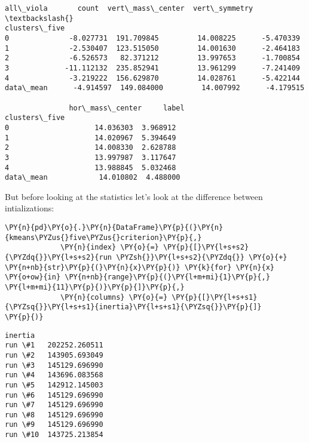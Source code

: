             \begin{tcolorbox}[breakable, size=fbox, boxrule=.5pt, pad at break*=1mm, opacityfill=0]
\begin{Verbatim}[commandchars=\\\{\}]
               all\_viola       count  vert\_mass\_center  vert\_symmetry  \textbackslash{}
clusters\_five
0              -8.027731  191.709845         14.008225      -5.470339
1              -2.530407  123.515050         14.001630      -2.464183
2              -6.526573   82.371212         13.997653      -1.700854
3             -11.112132  235.852941         13.961299      -7.241409
4              -3.219222  156.629870         14.028761      -5.422144
data\_mean      -4.914597  149.084000         14.007992      -4.179515

               hor\_mass\_center     label
clusters\_five
0                    14.036303  3.968912
1                    14.020967  5.394649
2                    14.008330  2.628788
3                    13.997987  3.117647
4                    13.988845  5.032468
data\_mean            14.010802  4.488000
\end{Verbatim}
\end{tcolorbox}
        
    But before looking at the statistics let's look at the difference
between intializations:

    \begin{tcolorbox}[breakable, size=fbox, boxrule=1pt, pad at break*=1mm,colback=cellbackground, colframe=cellborder]
\begin{Verbatim}[commandchars=\\\{\}]
\PY{n}{pd}\PY{o}{.}\PY{n}{DataFrame}\PY{p}{(}\PY{n}{kmeans\PYZus{}five\PYZus{}criterion}\PY{p}{,} 
             \PY{n}{index} \PY{o}{=} \PY{p}{[}\PY{l+s+s2}{\PYZdq{}}\PY{l+s+s2}{run \PYZsh{}}\PY{l+s+s2}{\PYZdq{}} \PY{o}{+} \PY{n+nb}{str}\PY{p}{(}\PY{n}{x}\PY{p}{)} \PY{k}{for} \PY{n}{x} \PY{o+ow}{in} \PY{n+nb}{range}\PY{p}{(}\PY{l+m+mi}{1}\PY{p}{,} \PY{l+m+mi}{11}\PY{p}{)}\PY{p}{]}\PY{p}{,} 
             \PY{n}{columns} \PY{o}{=} \PY{p}{[}\PY{l+s+s1}{\PYZsq{}}\PY{l+s+s1}{inertia}\PY{l+s+s1}{\PYZsq{}}\PY{p}{]}
\PY{p}{)}
\end{Verbatim}
\end{tcolorbox}

            \begin{tcolorbox}[breakable, size=fbox, boxrule=.5pt, pad at break*=1mm, opacityfill=0]
\begin{Verbatim}[commandchars=\\\{\}]
               inertia
run \#1   202252.260511
run \#2   143905.693049
run \#3   145129.696990
run \#4   143696.083568
run \#5   142912.145003
run \#6   145129.696990
run \#7   145129.696990
run \#8   145129.696990
run \#9   145129.696990
run \#10  143725.213854
\end{Verbatim}
\end{tcolorbox}
        
